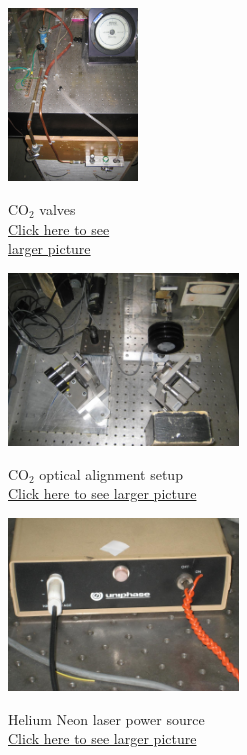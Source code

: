 \documentclass{../lab}
\begin{document}
\begin{figure}[H]
\captionsetup{justification=centering}
\centering
  \href{http://experimentationlab.berkeley.edu/sites/default/files/images/CO2_Valves_3568.jpg}{\includegraphics[height=130pt,keepaspectratio]{images/CO2_Valves_3568.jpg}}
  \caption{CO$_2$ valves\\ \href{http://experimentationlab.berkeley.edu/sites/default/files/images/CO2_Valves_3568.jpg}{Click here to see \\ larger picture}}
  \label{fig:CO2Valves}
\endminipage\hfill
{}
\centering
  \href{http://experimentationlab.berkeley.edu/sites/default/files/CO-2/CO2_Optics_3567_0.JPG}{\includegraphics[height=130pt,keepaspectratio]{images/CO2_Optics_3567_0.JPG}}
  \caption{CO$_2$ optical alignment setup \\
  \href{http://experimentationlab.berkeley.edu/sites/default/files/CO-2/CO2_Optics_3567_0.JPG}{Click here to see larger picture}}
  \label{fig:OpticalAlignment}
\endminipage\hfill
{}
\centering
  \href{http://experimentationlab.berkeley.edu/sites/default/files/images/HeNepower.jpg}{\includegraphics[height=130pt,keepaspectratio]{images/HeNepower.jpg}}
  \caption{Helium Neon laser power source \\ \href{http://experimentationlab.berkeley.edu/sites/default/files/images/HeNepower.jpg}{Click here to see larger picture}}\label{fig:HeNePower}
\endminipage
\end{figure}
\end{document}
